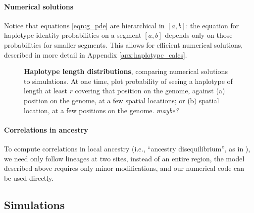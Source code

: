 \documentclass[12pt]{article}
\newcommand{\plr}[1]{{\em \color{blue} #1}}
\begin{document}
\paragraph{Numerical solutions}
Notice that equations \eqref{eqn:g_pde}
are hierarchical in $[a,b]$:
the equation for haplotype identity probabilities on a segment $[a,b]$ depends only on those probabilities for smaller segments.
This allows for efficient numerical solutions,
described in more detail in Appendix \ref{apx:haplotype_calcs}.

\begin{figure}
    \begin{center}
    \end{center}
    \caption{
        \textbf{Haplotype length distributions},
        comparing numerical solutions to simulations.
        At one time, plot 
        probability of seeing a haplotype of length at least $r$ covering that position on the genome,
        against (a) position on the genome, at a few spatial locations;
        or (b) spatial location, at a few positions on the genome.
        \plr{maybe?}
        \label{fig:haplotype_lengths}
    }
\end{figure}

\paragraph{Correlations in ancestry}
To compute correlations in local ancestry
(i.e., ``ancestry disequilibrium'', as in \citet{pool,brandvainthisvolume}),
we need only follow lineages at two sites, instead of an entire region,
the model described above requires only minor modifications,
and our numerical code can be used directly.


\subsection*{Simulations}
\end{document}
